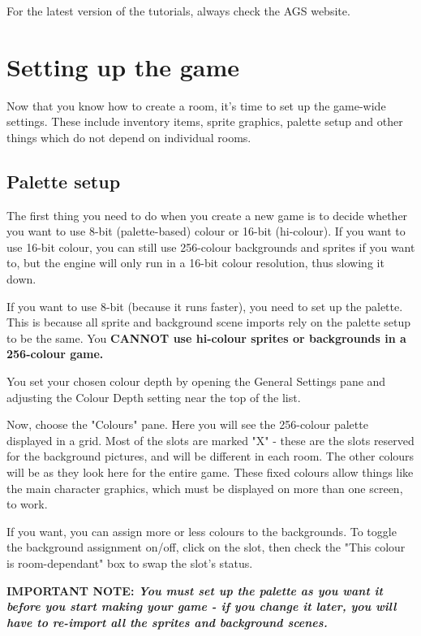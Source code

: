
For the latest version of the tutorials, always check the AGS website.


\section{Setting up the game}\label{Settingupthegame}%

Now that you know how to create a room, it's time to set up the game-wide
settings. These include inventory items, sprite graphics, palette setup
and other things which do not depend on individual rooms.

\subsection{Palette setup}\label{PalSetup}%

The first thing you need to do when you create a new game is to decide whether
you want to use 8-bit (palette-based) colour or 16-bit (hi-colour).
If you want to use 16-bit colour, you can still use 256-colour backgrounds and
sprites if you want to, but the engine will only run in a 16-bit colour
resolution, thus slowing it down.

If you want to use 8-bit (because it runs faster), you need to set up the
palette. This is because all sprite and background scene imports rely on the
palette setup to be the same. You \bf{CANNOT} use hi-colour sprites or backgrounds
in a 256-colour game.

You set your chosen colour depth by opening the General Settings pane and
adjusting the Colour Depth setting near the top of the list.

Now, choose the "Colours" pane. Here you will see the 256-colour
palette displayed in a grid. Most of the slots are marked "X" - these are the
slots reserved for the background pictures, and will be different in each
room. The other colours will be as they look here for the entire game. These
fixed colours allow things like the main character graphics, which must be
displayed on more than one screen, to work.

If you want, you can assign more or less colours to the backgrounds. To toggle
the background assignment on/off, click on the slot, then check the
"This colour is room-dependant" box to swap the slot's status.

\bf{IMPORTANT NOTE:} \it{You must set up the palette as you want it before you start
making your game - if you change it later, you will have to re-import all the
sprites and background scenes.}

